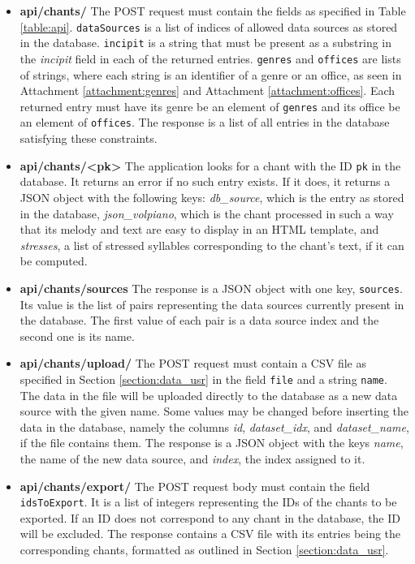 \begin{itemize}

\item \textbf{api/chants/} The POST request must contain the fields as specified in Table \ref{table:api}. \verb|dataSources| is a list of indices of allowed data sources as stored
in the database. \verb|incipit| is a string that must be present as a substring in the \emph{incipit} field in each of the returned entries. \verb|genres| and \verb|offices|
are lists of strings, where each string is an identifier of a genre or an office, as seen in Attachment \ref{attachment:genres} and Attachment \ref{attachment:offices}.
Each returned entry must have its genre be an element of \verb|genres| and its office be an element of \verb|offices|. The response is a list of all entries in the
database satisfying these constraints.

\item \textbf{api/chants/\textless pk\textgreater} The application looks for a chant with the ID \verb|pk| in the database. It returns an error if no such entry exists. If it does,
it returns a JSON object with the following keys: \emph{db\_source}, which is the entry as stored in the database, \emph{json\_volpiano}, which is the chant processed in
such a way that its melody and text are easy to display in an HTML template, and \emph{stresses}, a list of stressed syllables corresponding to the chant's text, if it
can be computed.

\item \textbf{api/chants/sources} The response is a JSON object with one key, \verb|sources|. Its value is the list of pairs representing the data sources currently present in
the database. The first value of each pair is a data source index and the second one is its name.

\item \textbf{api/chants/upload/} The POST request must contain a CSV file as specified in Section \ref{section:data_usr} in the field \verb|file| and a string \verb|name|. The data in the file
will be uploaded directly to the database as a new data source with the given name. Some values may be changed before inserting the data in the database, namely the columns
\emph{id}, \emph{dataset\_idx}, and \emph{dataset\_name}, if the file contains them. The response is a JSON object with the keys \emph{name}, the name of the new data
source, and \emph{index}, the index assigned to it.

\item \textbf{api/chants/export/} The POST request body must contain the field \verb|idsToExport|. It is a list of integers representing the IDs of the chants to be exported. If
an ID does not correspond to any chant in the database, the ID will be excluded. The response contains a CSV file with its entries being the corresponding chants, formatted
as outlined in Section \ref{section:data_usr}.


\end{itemize}
